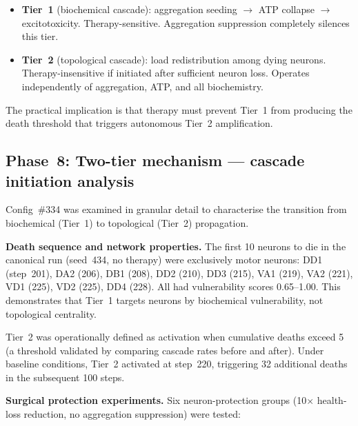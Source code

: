 \documentclass[12pt,a4paper]{article}
\begin{document}
\begin{itemize}
\item \textbf{Tier~1} (biochemical cascade): aggregation seeding $\to$ ATP collapse $\to$
excitotoxicity. Therapy-sensitive. Aggregation suppression completely silences this tier.
\item \textbf{Tier~2} (topological cascade): load redistribution among dying neurons.
Therapy-insensitive if initiated after sufficient neuron loss. Operates independently of
aggregation, ATP, and all biochemistry.
\end{itemize}

The practical implication is that therapy must prevent Tier~1 from producing the death threshold
that triggers autonomous Tier~2 amplification.

\subsection{Phase~8: Two-tier mechanism --- cascade initiation analysis}

Config~\#334 was examined in granular detail to characterise the transition from biochemical
(Tier~1) to topological (Tier~2) propagation.

\textbf{Death sequence and network properties.} The first 10 neurons to die in the canonical
run (seed~434, no therapy) were exclusively motor neurons: DD1 (step~201), DA2 (206), DB1
(208), DD2 (210), DD3 (215), VA1 (219), VA2 (221), VD1 (225), VD2 (225), DD4 (228). All had
vulnerability scores 0.65--1.00. This demonstrates that Tier~1 targets neurons by biochemical
vulnerability, not topological centrality.

Tier~2 was operationally defined as activation when cumulative deaths exceed 5 (a threshold
validated by comparing cascade rates before and after). Under baseline conditions, Tier~2
activated at step~220, triggering 32 additional deaths in the subsequent 100 steps.

\textbf{Surgical protection experiments.} Six neuron-protection groups (10$\times$ health-loss
reduction, no aggregation suppression) were tested:
\end{document}
